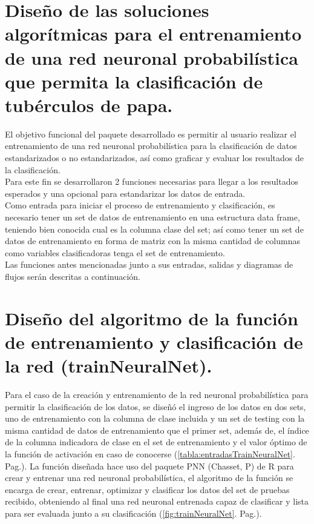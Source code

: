 \section{Diseño de las soluciones algorítmicas para el entrenamiento de una red neuronal probabilística que permita la clasificación de tubérculos de papa.}

	El objetivo funcional del paquete desarrollado es permitir al usuario realizar el entrenamiento de una red neuronal probabilística para la clasificación de datos estandarizados o no estandarizados, así como graficar y evaluar los resultados de la clasificación.\\

	Para este fin se desarrollaron 2 funciones necesarias para llegar a los resultados esperados y una opcional para estandarizar los datos de entrada. \\

	Como entrada para iniciar el proceso de entrenamiento y clasificación, es necesario tener un set de datos de entrenamiento en una estructura data frame, teniendo bien conocida cual es la columna clase del set; así como tener un set de datos de entrenamiento en forma de matriz con la misma cantidad de columnas como variables clasificadoras tenga el set de entrenamiento.\\

	Las funciones antes mencionadas junto a sus entradas, salidas y diagramas de flujos serán descritas a continuación.\\


\section{Diseño del algoritmo de la función de entrenamiento y clasificación de la red (trainNeuralNet).}

	Para el caso de la creación y entrenamiento de la red neuronal probabilística para permitir la clasificación de los datos, se diseñó el ingreso de los datos en dos sets, uno de entrenamiento con la columna de clase incluida y un set de testing con la misma cantidad de datos de entrenamiento que el primer set, además de, el índice de la columna indicadora de clase en el set de entrenamiento y el valor 
óptimo de la función de activación en caso de conocerse (\ref{tabla:entradasTrainNeuralNet}. Pag.\pageref{tabla:entradasTrainNeuralNet}). La función diseñada hace uso del paquete PNN (Chasset, P) de R para crear y entrenar una red neuronal probabilística, el algoritmo de la función se encarga de crear, entrenar, optimizar y clasificar los datos del set de pruebas recibido, obteniendo al final una red neuronal entrenada capaz de clasificar y lista para ser evaluada junto a su clasificación (\ref{fig:trainNeuralNet}. Pag.\pageref{fig:trainNeuralNet}).\\

